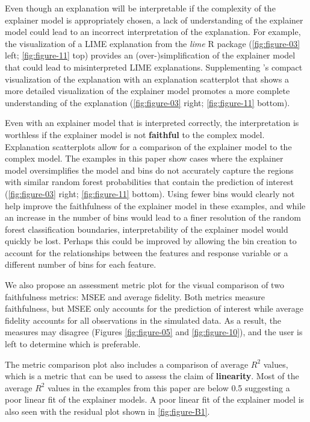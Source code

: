 \documentclass[AMS,STIX2COL]{WileyNJD-v2}\usepackage[]{graphicx}\usepackage[]{color}
\begin{document}
Even though an explanation will be interpretable if  the complexity of the explainer model is appropriately chosen, a lack of understanding of the explainer model could lead to an incorrect interpretation of the explanation. For example, the visualization of a LIME explanation from the \emph{lime} R package \citep{pedersen:2020} (\autoref{fig:figure-03} left; \autoref{fig:figure-11} top) provides an (over-)simplification of the explainer model that could lead to misinterpreted LIME explanations. Supplementing \citet{pedersen:2020}'s compact visualization of the explanation with an explanation scatterplot that shows a more detailed visualization of the explainer model promotes a more complete understanding of the explanation (\autoref{fig:figure-03} right; \autoref{fig:figure-11} bottom).

Even with an explainer model that is interpreted correctly, the interpretation is worthless if the explainer model is not \textbf{faithful} to the complex model. Explanation scatterplots allow for a comparison of the explainer model to the complex model. The examples in this paper show cases where the explainer model oversimplifies the model and bins do not accurately capture the regions with similar random forest probabilities that contain the prediction of interest (\autoref{fig:figure-03} right; \autoref{fig:figure-11} bottom). Using fewer bins would clearly not help improve the faithfulness of the explainer model in these examples, and while an increase in the number of bins would lead to a finer resolution of the random forest classification boundaries, interpretability of the explainer model would quickly be lost. Perhaps this could be improved by allowing the bin creation to account for the relationships between the features and response variable or a different number of bins for each feature.

We also propose an assessment metric plot for the visual comparison of two faithfulness metrics: MSEE and average fidelity. Both metrics measure faithfulness, but MSEE only accounts for the prediction of interest while average fidelity accounts for all observations in the simulated data. As a result, the measures may disagree (Figures \ref{fig:figure-05} and \ref{fig:figure-10}), and the user is left to determine which is preferable. 

The metric comparison plot also includes a comparison of average $R^2$ values, which is a metric that can be used to assess the claim of \textbf{linearity}. Most of the average $R^2$ values in the examples from this paper are below 0.5 suggesting a poor linear fit of the explainer models. A poor linear fit of the explainer model is also seen with the residual plot shown in \autoref{fig:figure-B1}.
\end{document}
